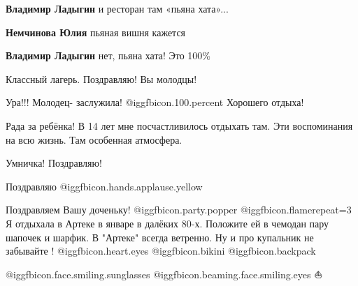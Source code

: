 \begin{itemize}
\begin{itemize} %
\textbf{Владимир Ладыгин} и ресторан там «пьяна хата»...

\textbf{Немчинова Юлия} пьяная вишня кажется

\textbf{Владимир Ладыгин} нет, пьяна хата! Это 100\%
\end{itemize} %

Классный лагерь. Поздравляю! Вы молодцы!

Ура!!! Молодец- заслужила!  @igg{fbicon.100.percent} 
Хорошего отдыха!

Рада за ребёнка! В 14 лет мне посчастливилось отдыхать там. Эти воспоминания на всю жизнь. Там особенная атмосфера.

Умничка! Поздравляю!

Поздравляю @igg{fbicon.hands.applause.yellow} 


Поздравляем Вашу доченьку!  @igg{fbicon.party.popper}  @igg{fbicon.flame}{repeat=3}  Я отдыхала в Артеке в январе в далёких
80-х. Положите ей в чемодан пару шапочек и шарфик. В "Артеке" всегда ветренно.
Ну и про купальник не забывайте ! @igg{fbicon.heart.eyes}  @igg{fbicon.bikini}  @igg{fbicon.backpack} 

\begin{itemize} %
 @igg{fbicon.face.smiling.sunglasses}  @igg{fbicon.beaming.face.smiling.eyes} ⛵
\end{itemize} %

\end{itemize} %
